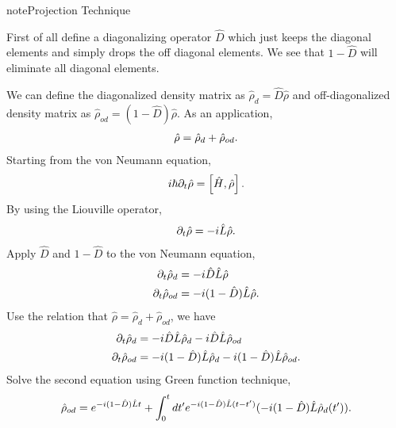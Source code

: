 \documentclass[letterpaper,12pt,english]{sphinxmanual}
\begin{document}
\begin{notice}{note}{Projection Technique}

First of all define a diagonalizing operator \(\hat D\) which just keeps the diagonal elements and simply drops the off diagonal elements. We see that \(1-\hat D\) will eliminate all diagonal elements.

We can define the diagonalized density matrix as \(\hat \rho_d = \hat D \hat \rho\) and off-diagonalized density matrix as \(\hat \rho_{od} = (1-\hat D)\hat \rho\). As an application,
\begin{gather}
\begin{split}\hat \rho = \hat \rho_d + \hat \rho_{od} .\end{split}\notag
\end{gather}
Starting from the von Neumann equation,
\begin{gather}
\begin{split}i\hbar \partial_t \hat \rho = \left[\hat H, \hat \rho \right] .\end{split}\notag
\end{gather}
By using the Liouville operator,
\begin{gather}
\begin{split}\partial_t \hat \rho = -i \hat L \hat \rho .\end{split}\notag
\end{gather}
Apply \(\hat D\) and \(1-\hat D\) to the von Neumann equation,
\begin{gather}
\begin{split}\partial_t \hat \rho_d & = -i \hat D  \hat L \hat \rho \\
\partial_t \hat \rho _{od} & = -i (1 - \hat D)  \hat L \hat \rho .\end{split}\notag
\end{gather}
Use the relation that \(\hat \rho = \hat \rho_d + \hat \rho_{od}\), we have
\begin{gather}
\begin{split}\partial_t \hat \rho_d & = -i \hat D  \hat L \hat \rho_d - i \hat D  \hat L \hat \rho _ {od} \\
\partial_t \hat \rho _{od} & = - i (1 - \hat D)  \hat L \hat \rho _ d - i (1 - \hat D)  \hat L \hat \rho_{od}  .\end{split}\notag
\end{gather}
Solve the second equation using Green function technique,
\begin{gather}
\begin{split}\hat \rho_{od} = e^{-i(1-\hat D)\hat L t} + \int_0^t dt' e^{-i(1-\hat D) \hat L (t-t')}(-i(1-\hat D)\hat L \hat \rho_d(t')) .\end{split}\notag

\end{gather}
\end{notice}
\end{document}
